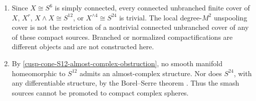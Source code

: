 \begin{theorem}
\begin{enumerate}
\item Since \(X\cong S^6\) is simply connected, every connected unbranched
finite cover of \(X\), \(X^r\), \(X\wedge X\cong S^{12}\), or
\(X^{\wedge4}\cong S^{24}\) is trivial.  The local degree-\(M^2\)
unspooling cover is not the restriction of a nontrivial connected
unbranched cover of any of these compact sources.  Branched or normalized
compactifications are different objects and are not constructed here.

\item By \cref{cusp-cone-S12-almost-complex-obstruction}, no smooth manifold
homeomorphic to \(S^{12}\) admits an almost-complex structure.  Nor does
\(S^{24}\), with any differentiable structure, by the Borel--Serre theorem
\cite[\S15, Proposition~15.1 and the following remark,
p.~434]{BorelSerre1953}.  Thus the smash sources cannot be promoted to
compact complex spheres.
\end{enumerate}
\end{theorem}

